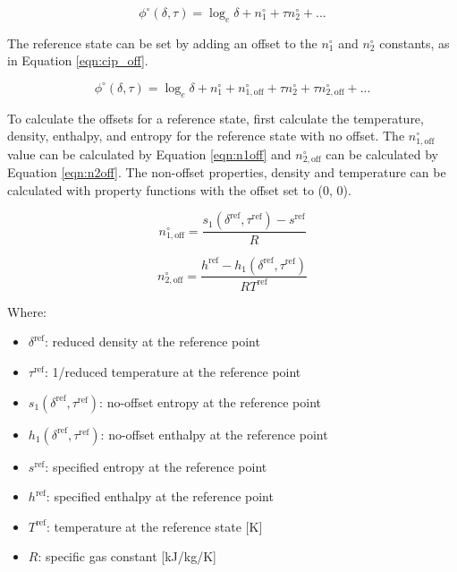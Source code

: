 \documentclass[oneside]{book}
\begin{document}
\begin{equation}\label{eqn:cip}
	\phi^\circ(\delta, \tau) = \log_e \delta + n_1^\circ + \tau n_2^\circ + ...
\end{equation}

The reference state can be set by adding an offset to the $n_1^\circ$ and $n_2^\circ$ constants, as in Equation \ref{eqn:cip_off}.

\begin{equation}\label{eqn:cip_off}
	\phi^\circ(\delta, \tau) = \log_e \delta + n_1^\circ + n^\circ_{1, \text{off}} + \tau n_2^\circ + \tau n^\circ_{2, \text{off}} +  ...
\end{equation}

To calculate the offsets for a reference state, first calculate the temperature, density, enthalpy, and entropy for the reference state with no offset. The $n^\circ_{1, \text{off}}$ value can be calculated by Equation \ref{eqn:n1off} and  $n^\circ_{2, \text{off}}$ can be calculated by Equation \ref{eqn:n2off}. The non-offset properties, density and temperature can be calculated with property functions with the offset set to (0, 0).

\begin{equation}\label{eqn:n1off}
	n^\circ_{1, \text{off}} = \frac{s_1(\delta^{\text{ref}}, \tau^{\text{ref}}) - s^{\text{ref}}}{R}
\end{equation}

\begin{equation}\label{eqn:n2off}
	n^\circ_{2, \text{off}} = \frac{h^{\text{ref}} - h_1(\delta^{\text{ref}}, \tau^{\text{ref}})}{RT^{\text{ref}}}
\end{equation}

Where:
\begin{itemize}
	\item $\delta^{\text{ref}}$: reduced density at the reference point
	\item $\tau^{\text{ref}}$: 1/reduced temperature at the reference point
	\item $s_1(\delta^{\text{ref}}, \tau^{\text{ref}})$: no-offset entropy at the reference point
	\item $h_1(\delta^{\text{ref}}, \tau^{\text{ref}})$: no-offset enthalpy at the reference point
	\item $s^{\text{ref}}$: specified entropy at the reference point
	\item $h^{\text{ref}}$: specified enthalpy at the reference point
	\item $T^{\text{ref}}$: temperature at the reference state [K]
	\item $R$: specific gas constant [kJ/kg/K]
\end{itemize}
\end{document}
